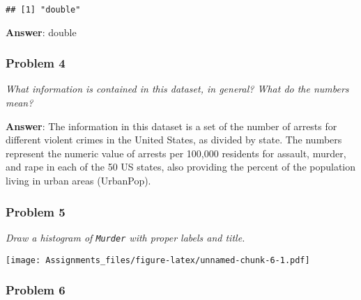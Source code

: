\documentclass[
]{article}
\newenvironment{Shaded}{\begin{snugshade}}{\end{snugshade}}
\newcommand{\AttributeTok}[1]{\textcolor[rgb]{0.77,0.63,0.00}{#1}}
\newcommand{\FunctionTok}[1]{\textcolor[rgb]{0.00,0.00,0.00}{#1}}
\newcommand{\NormalTok}[1]{#1}
\newcommand{\SpecialCharTok}[1]{\textcolor[rgb]{0.00,0.00,0.00}{#1}}
\newcommand{\StringTok}[1]{\textcolor[rgb]{0.31,0.60,0.02}{#1}}
\begin{document}
\begin{verbatim}
## [1] "double"
\end{verbatim}

\textbf{Answer}: double

\hypertarget{problem-4}{%
\subsubsection{Problem 4}\label{problem-4}}

\emph{What information is contained in this dataset, in general? What do
the numbers mean? }

\textbf{Answer}: The information in this dataset is a set of the number
of arrests for different violent crimes in the United States, as divided
by state. The numbers represent the numeric value of arrests per 100,000
residents for assault, murder, and rape in each of the 50 US states,
also providing the percent of the population living in urban areas
(UrbanPop).

\hypertarget{problem-5}{%
\subsubsection{Problem 5}\label{problem-5}}

\emph{Draw a histogram of \texttt{Murder} with proper labels and title.}

\begin{Shaded}
\end{Shaded}

\texttt{[image: Assignments\_files/figure-latex/unnamed-chunk-6-1.pdf]}

\hypertarget{problem-6}{%
\subsubsection{Problem 6}\label{problem-6}}
\end{document}
